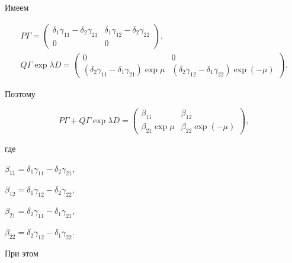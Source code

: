 \begin{pf}


Имеем


\begin{gather*}


P\Gamma=


\begin{pmatrix}


\delta_1\gamma_{11}-\delta_2\gamma_{21} &


\delta_1\gamma_{12}-\delta_2\gamma_{22}\\


0 & 0


\end{pmatrix}


,\\


Q\Gamma\exp\lambda D=


\begin{pmatrix}


0 & 0\\


(\delta_2\gamma_{11}-\delta_1\gamma_{21})\exp\mu &


(\delta_2\gamma_{12}-\delta_1\gamma_{22})\exp(-\mu)


\end{pmatrix}


.


\end{gather*}


Поэтому


$$


P\Gamma+Q\Gamma\exp\lambda D=


\begin{pmatrix}


\beta_{11} & \beta_{12}\\


\beta_{21}\exp\mu & \beta_{22}\exp(-\mu)


\end{pmatrix}


,


$$


где


$\beta_{11}=\delta_1\gamma_{11}-\delta_2\gamma_{21}$,


$\beta_{12}=\delta_1\gamma_{12}-\delta_2\gamma_{22}$,


$\beta_{21}=\delta_2\gamma_{11}-\delta_1\gamma_{21}$,


$\beta_{22}=\delta_2\gamma_{12}-\delta_1\gamma_{22}$.


При этом



\end{pf}
